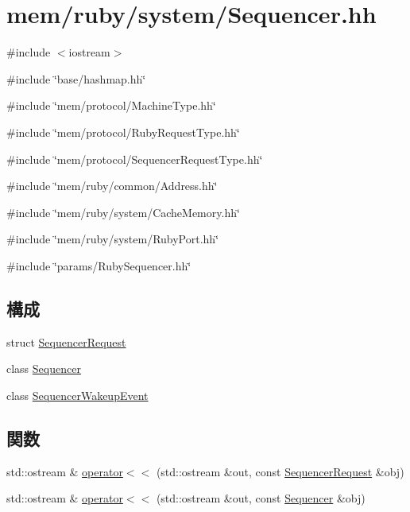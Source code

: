 \hypertarget{Sequencer_8hh}{
\section{mem/ruby/system/Sequencer.hh}
\label{Sequencer_8hh}
}
{\ttfamily \#include $<$iostream$>$}\par
{\ttfamily \#include \char`\"{}base/hashmap.hh\char`\"{}}\par
{\ttfamily \#include \char`\"{}mem/protocol/MachineType.hh\char`\"{}}\par
{\ttfamily \#include \char`\"{}mem/protocol/RubyRequestType.hh\char`\"{}}\par
{\ttfamily \#include \char`\"{}mem/protocol/SequencerRequestType.hh\char`\"{}}\par
{\ttfamily \#include \char`\"{}mem/ruby/common/Address.hh\char`\"{}}\par
{\ttfamily \#include \char`\"{}mem/ruby/system/CacheMemory.hh\char`\"{}}\par
{\ttfamily \#include \char`\"{}mem/ruby/system/RubyPort.hh\char`\"{}}\par
{\ttfamily \#include \char`\"{}params/RubySequencer.hh\char`\"{}}\par
\subsection*{構成}
\begin{DoxyCompactItemize}
\item 
struct \hyperlink{structSequencerRequest}{SequencerRequest}
\item 
class \hyperlink{classSequencer}{Sequencer}
\item 
class \hyperlink{classSequencer_1_1SequencerWakeupEvent}{SequencerWakeupEvent}
\end{DoxyCompactItemize}
\subsection*{関数}
\begin{DoxyCompactItemize}
\item 
std::ostream \& \hyperlink{Sequencer_8hh_adb95dfdb7c6bdd6c52bdfe35ce8449aa}{operator$<$$<$} (std::ostream \&out, const \hyperlink{structSequencerRequest}{SequencerRequest} \&obj)
\item 
std::ostream \& \hyperlink{Sequencer_8hh_ac52709b647b4bac80da596daa1f8f442}{operator$<$$<$} (std::ostream \&out, const \hyperlink{classSequencer}{Sequencer} \&obj)
\end{DoxyCompactItemize}


